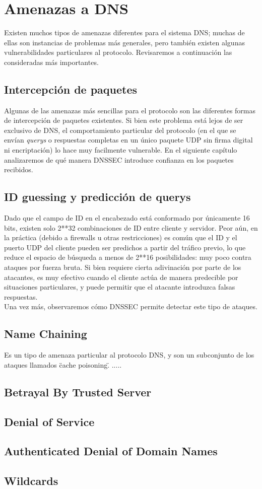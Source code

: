 \chapter{Amenazas a DNS}
Existen muchos tipos de amenazas diferentes para el sistema DNS; muchas de ellas son instancias de problemas más generales, pero también existen algunas vulnerabilidades particulares al protocolo. Revisaremos a continuación las consideradas más importantes\cite{rfc3833}.
\section{Intercepción de paquetes}
Algunas de las amenazas más sencillas para el protocolo son las diferentes formas de intercepción de paquetes existentes. Si bien este problema está lejos de ser exclusivo de DNS, el comportamiento particular del protocolo (en el que se envían \textit{querys} o respuestas completas en un único paquete UDP sin firma digital ni encriptación) lo hace muy facilmente vulnerable. En el siguiente capítulo analizaremos de qué manera DNSSEC introduce confianza en los paquetes recibidos.
\section{ID guessing y predicción de querys}
Dado que el campo de ID en el encabezado está conformado por únicamente 16 bits, existen solo 2**32 combinaciones de ID entre cliente y servidor. Peor aún, en la práctica (debido a firewalls u otras restricciones) es común que el ID y el puerto UDP del cliente pueden ser predichos a partir del tráfico previo, lo que reduce el espacio de búsqueda a menos de 2**16 posibilidades: muy poco contra ataques por fuerza bruta. Si bien requiere cierta adivinación por parte de los atacantes, es muy efectivo cuando el cliente actúa de manera predecible por situaciones particulares, y puede permitir que el atacante introduzca falsas respuestas.\\
Una vez más, observaremos cómo DNSSEC permite detectar este tipo de ataques.
\section{Name Chaining}
Es un tipo de amenaza particular al protocolo DNS, y son un subconjunto de los ataques llamados \" cache poisoning\" . .....
\section{Betrayal By Trusted Server}
\section{Denial of Service}
\section{Authenticated Denial of Domain Names}
\section{Wildcards}
